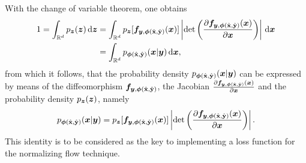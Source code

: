 \documentclass[a4paper,12pt]{report}
\begin{document}
With the change of variable theorem, one obtains \begin{align}
\begin{aligned}
1 = \int_{\mathbb{R}^d} p_{\bm{z}}(\bm{z})\,\mathrm{d}\bm{z} &= \int_{\mathbb{R}^d}p_{\bm{z}}[\bm{f}_{\bm{y},\bm{\phi}(\hat{\boldsymbol{\mathbf{x}}},\hat{\boldsymbol{\mathbf{y}}})}(\bm{x})]\left|\det\left(\frac{\partial \bm{f}_{\bm{y},\bm{\phi}(\hat{\boldsymbol{\mathbf{x}}},\hat{\boldsymbol{\mathbf{y}}})}(\bm{x})}{\partial \bm{x}}\right)\right|\,\mathrm{d}\bm{x} \\ &= \int_{\mathbb{R}^d} p_{\bm{\phi}(\hat{\boldsymbol{\mathbf{x}}},\hat{\boldsymbol{\mathbf{y}}})}(\bm{x}|\bm{y})\,\mathrm{d}\bm{x},
\end{aligned}
\end{align} from which it follows, that the probability density $p_{\bm{\phi}(\hat{\boldsymbol{\mathbf{x}}},\hat{\boldsymbol{\mathbf{y}}})}(\bm{x}|\bm{y})$ can be expressed by means of the diffeomorphism $\bm{f}_{\bm{y},\bm{\phi}(\hat{\boldsymbol{\mathbf{x}}},\hat{\boldsymbol{\mathbf{y}}})}$, the Jacobian $\tfrac{\partial \bm{f}_{\bm{y},\bm{\phi}(\hat{\boldsymbol{\mathbf{x}}},\hat{\boldsymbol{\mathbf{y}}})}(\bm{x})}{\partial \bm{x}}$ and the probability density $p_{\bm{z}}(\bm{z})$, namely \begin{equation}\label{eq:heartofnormflowswithcontext}
p_{\bm{\phi}(\hat{\boldsymbol{\mathbf{x}}},\hat{\boldsymbol{\mathbf{y}}})}(\bm{x}|\bm{y}) = p_{\bm{z}}[\bm{f}_{\bm{y},\bm{\phi}(\hat{\boldsymbol{\mathbf{x}}},\hat{\boldsymbol{\mathbf{y}}})}(\bm{x})]\left|\det\left(\frac{\partial \bm{f}_{\bm{y},\bm{\phi}(\hat{\boldsymbol{\mathbf{x}}},\hat{\boldsymbol{\mathbf{y}}})}(\bm{x})}{\partial \bm{x}}\right)\right|.
\end{equation} This identity is to be considered as the key to implementing a loss function for the normalizing flow technique.
\end{document}
